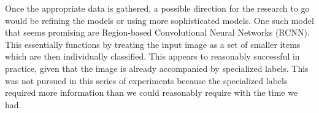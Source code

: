 \documentclass[10pt,Times New Roman]{article}
\begin{document}
Once the appropriate data is gathered, a possible direction for the research to go would be
refining the models or using more sophisticated models. One such model that seems promising
are Region-based Convolutional Neural Networks (RCNN). This essentially functions by treating
the input image as a set of smaller items which are then individually classified. This appears
to reasonably successful in practice, given that the image is already accompanied by specialized
labels. This was not pursued in this series of experiments because the specialized labels
required more information than we could reasonably require with the time we had.
\end{document}
